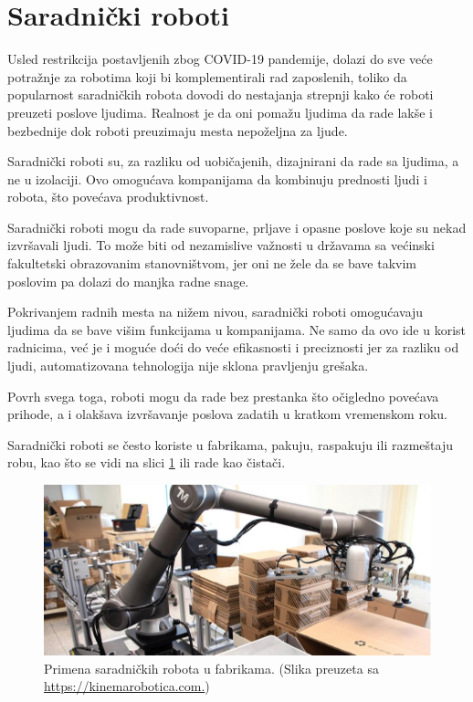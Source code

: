 \documentclass{article}
\begin{document}
	
	\section{Saradnički roboti}
	
	Usled restrikcija postavljenih zbog COVID-19 pandemije, dolazi do sve veće potražnje za robotima koji bi komplementirali rad zaposlenih, toliko da popularnost saradničkih robota dovodi do nestajanja strepnji kako će roboti preuzeti poslove ljudima. Realnost je da oni pomažu ljudima da rade lakše i bezbednije dok roboti preuzimaju mesta nepoželjna za ljude.
	
	Saradnički roboti su, za razliku od uobičajenih, dizajnirani da rade sa ljudima, a ne u izolaciji. Ovo omogućava kompanijama da kombinuju prednosti ljudi i robota, što povećava produktivnost. \cite{robotics2022}
	
	Saradnički roboti mogu da rade suvoparne, prljave i opasne poslove koje su nekad izvršavali ljudi. To može biti od nezamislive važnosti u državama sa većinski fakultetski obrazovanim stanovništvom, jer oni ne žele da se bave takvim poslovim pa dolazi do manjka radne snage.
	
	Pokrivanjem radnih mesta na nižem nivou, saradnički roboti omogućavaju ljudima da se bave višim funkcijama u kompanijama. Ne samo da ovo ide u korist radnicima, već je i moguće doći do veće efikasnosti i preciznosti jer za razliku od ljudi, automatizovana tehnologija nije sklona pravljenju grešaka.
	
	Povrh svega toga, roboti mogu da rade bez prestanka što očigledno povećava prihode, a i olakšava izvršavanje poslova zadatih u kratkom vremenskom roku. \cite{cobots}
	
	Saradnički roboti se često koriste u fabrikama, pakuju, raspakuju ili razmeštaju robu, kao što se vidi na slici \ref{cobot} ili rade kao čistači. \cite{robots2022}
	
	\begin{figure}
		\centering
		\includegraphics[scale=0.41]{Cobot.jpg}
		\caption{Primena saradničkih robota u fabrikama. (Slika preuzeta sa \url{https://kinemarobotica.com.})}
		\label{cobot}
	\end{figure}
	
\end{document}
